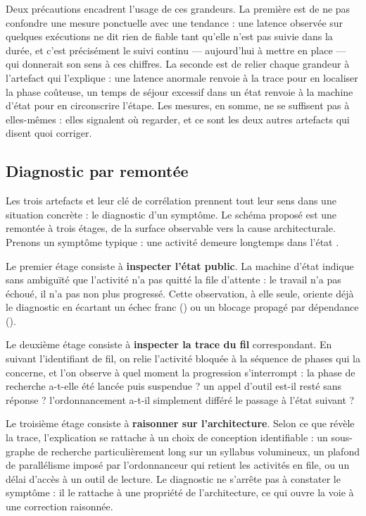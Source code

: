 Deux précautions encadrent l'usage de ces grandeurs. La première est
de ne pas confondre une mesure ponctuelle avec une tendance : une
latence observée sur quelques exécutions ne dit rien de fiable tant
qu'elle n'est pas suivie dans la durée, et c'est précisément le suivi
continu — aujourd'hui à mettre en place — qui donnerait son sens à ces
chiffres. La seconde est de relier chaque grandeur à l'artefact qui
l'explique : une latence anormale renvoie à la trace pour en localiser
la phase coûteuse, un temps de séjour excessif dans un état renvoie à
la machine d'état pour en circonscrire l'étape. Les mesures, en somme,
ne se suffisent pas à elles-mêmes : elles signalent où regarder, et ce
sont les deux autres artefacts qui disent quoi corriger.

\subsection{Diagnostic par remontée}
\label{sec:diagnostic}

Les trois artefacts et leur clé de corrélation prennent tout leur sens
dans une situation concrète : le diagnostic d'un symptôme. Le schéma
proposé est une remontée à trois étages, de la surface observable vers
la cause architecturale. Prenons un symptôme typique : une activité
demeure longtemps dans l'état .

Le premier étage consiste à \textbf{inspecter l'état public}. La
machine d'état indique sans ambiguïté que l'activité n'a pas quitté la
file d'attente : le travail n'a pas échoué, il n'a pas non plus
progressé. Cette observation, à elle seule, oriente déjà le diagnostic
en écartant un échec franc () ou un blocage propagé
par dépendance ().

Le deuxième étage consiste à \textbf{inspecter la trace du fil}
correspondant. En suivant l'identifiant de fil, on relie l'activité
bloquée à la séquence de phases qui la concerne, et l'on observe à
quel moment la progression s'interrompt : la phase de recherche
a-t-elle été lancée puis suspendue ? un appel d'outil est-il resté
sans réponse ? l'ordonnancement a-t-il simplement différé le passage à
l'état suivant ?

Le troisième étage consiste à \textbf{raisonner sur l'architecture}.
Selon ce que révèle la trace, l'explication se rattache à un choix de
conception identifiable : un sous-graphe de recherche
particulièrement long sur un syllabus volumineux, un plafond de
parallélisme imposé par l'ordonnanceur qui retient les activités en
file, ou un délai d'accès à un outil de lecture. Le diagnostic ne
s'arrête pas à constater le symptôme : il le rattache à une propriété
de l'architecture, ce qui ouvre la voie à une correction raisonnée.


